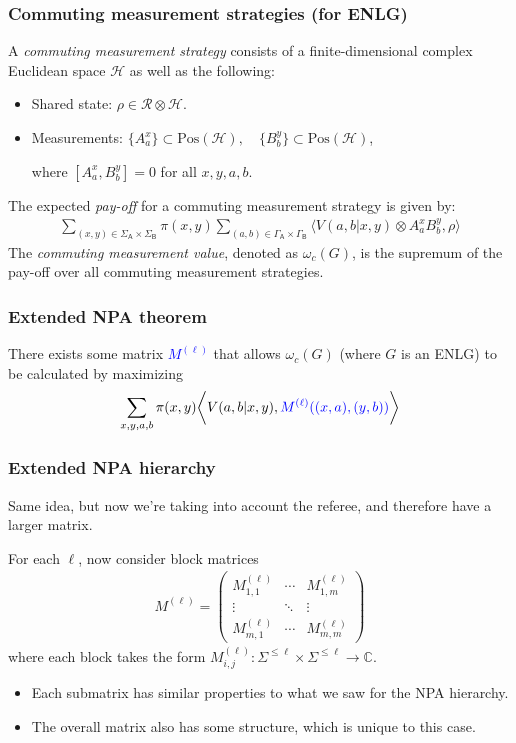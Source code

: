 \documentclass{beamer}
\newcommand{\biggip}[2]{\biggl\langle #1, #2 \biggr\rangle}
\def\H{\mathcal{H}}
\def\R{\mathcal{R}}
\def\complex{\mathbb{C}}
\def \GammaA{\Gamma_{\reg{A}}}
\def \GammaB{\Gamma_{\reg{B}}}
\def \SigmaA{\Sigma_{\reg{A}}}
\def \SigmaB{\Sigma_{\reg{B}}}
\newcommand{\setft}[1]{\mathrm{#1}}
\newcommand{\Pos}{\setft{Pos}}
\newcommand{\reg}[1]{\mathsf{#1}}
\begin{document}
\begin{frame}
	\frametitle{Commuting measurement strategies (for ENLG)}
	A \emph{commuting measurement strategy} consists of a finite-dimensional complex Euclidean space $\H$ as well as the following:
	\begin{itemize}
		\item Shared state: $\rho \in \R \otimes \H$.
		\item Measurements: $\{ A_a^x \} \subset \Pos(\H), \quad \{ B_b^y \} \subset \Pos(\H)$,
			
			where $[A_a^x, B_b^y] = 0$ for all $x,y,a,b$. 
	\end{itemize}
	\pause
	\vspace{5mm}
	The expected \emph{pay-off} for a commuting measurement strategy is given by:
	\begin{align*}
		\sum_{(x,y) \in \SigmaA \times \SigmaB} \pi(x,y) \sum_{(a,b) \in \GammaA \times \GammaB} \biggip{V(a,b|x,y) \otimes A_a^x B_b^y}{\rho}
	\end{align*}
	The \emph{commuting measurement value}, denoted as $\omega_c(G)$, is the supremum of the pay-off over all commuting measurement strategies.
\end{frame}

\begin{frame}
	\frametitle{Extended NPA theorem}
	There exists some matrix \textcolor{blue}{$M^{(\ell)}$} that allows $\omega_c(G)$ (where $G$ is an ENLG) to be calculated by maximizing 
	\begin{align*}
		\sum_{x,y,a,b} \pi(x,y) \biggip{V(a,b|x,y)}{\textcolor{blue}{M^{(\ell)}((x,a),(y,b))}}
	\end{align*}
\end{frame}

\begin{frame}
	\frametitle{Extended NPA hierarchy}
	Same idea, but now we're taking into account the referee, and therefore have a larger matrix.
		
	For each $\ell$, now consider block matrices
	\begin{align*}
		M^{(\ell)} = \begin{pmatrix} M_{1,1}^{(\ell)} & \cdots & M_{1,m}^{(\ell)} \\ \vdots & \ddots & \vdots \\ M_{m,1}^{(\ell)} & \cdots & M_{m,m}^{(\ell)} \end{pmatrix}
	\end{align*}
	where each block takes the form $M_{i,j}^{(\ell)} : \Sigma^{\leq \ell} \times \Sigma^{\leq \ell} \rightarrow \complex$. 
	\begin{itemize}
		\item Each submatrix has similar properties to what we saw for the NPA hierarchy. 
		\item The overall matrix also has some structure, which is unique to this case.
	\end{itemize}
\end{frame}
\end{document}
